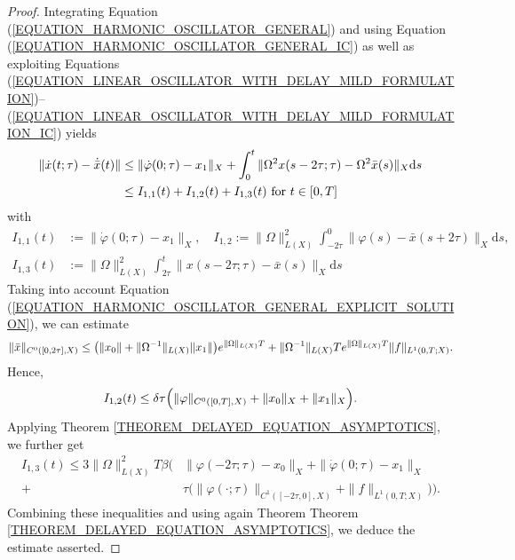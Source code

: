 \documentclass[12pt]{article}
\numberwithin{equation}{section}
\numberwithin{equation}{section}
\begin{document}
	\begin{proof}
		Integrating Equation (\ref{EQUATION_HARMONIC_OSCILLATOR_GENERAL}) and using Equation (\ref{EQUATION_HARMONIC_OSCILLATOR_GENERAL_IC})
		as well as exploiting Equations (\ref{EQUATION_LINEAR_OSCILLATOR_WITH_DELAY_MILD_FORMULATION})--(\ref{EQUATION_LINEAR_OSCILLATOR_WITH_DELAY_MILD_FORMULATION_IC}) yields
		\begin{align*}
			\|\dot{x}(t; \tau) - \dot{\bar{x}}(t)\| &\leq 
			\|\dot{\varphi}(0; \tau) - x_{1}\|_{X} +
			\int_{0}^{t} \|\Omega^{2} x(s - 2\tau; \tau) - \Omega^{2} \bar{x}(s)\|_{X} \mathrm{d}s \\
						&\leq I_{1, 1}(t) + I_{1, 2}(t) + I_{1, 3}(t) \text{ for } t \in [0, T] \notag
		\end{align*}
		with
		\begin{align*}
			I_{1, 1}(t) &:= \|\dot{\varphi}(0; \tau) - x_{1}\|_{X}, \quad I_{1, 2} := \|\Omega\|_{L(X)}^{2} \int_{-2\tau}^{0} \|\varphi(s) - \bar{x}(s + 2\tau)\|_{X} \mathrm{d}s, \\
						I_{1, 3}(t) &:= \|\Omega\|_{L(X)}^{2} \int_{2\tau}^{t} \|x(s - 2\tau; \tau) - \bar{x}(s)\|_{X} \mathrm{d}s
		\end{align*}
		Taking into account Equation (\ref{EQUATION_HARMONIC_OSCILLATOR_GENERAL_EXPLICIT_SOLUTION}), we can estimate
		\begin{equation}
			\|\bar{x}\|_{C^{0}([0, 2\tau], X)} \leq \big(\|x_{0}\| + \|\Omega^{-1}\|_{L(X)} \|x_{1}\|\big) e^{\|\Omega\|_{L(X)} T} +
			\|\Omega^{-1}\|_{L(X)} T e^{\|\Omega\|_{L(X)} T} \|f\|_{L^{1}(0, T; X)}. \notag
		\end{equation}
		Hence,
		\begin{align*}
			I_{1, 2}(t) \leq \delta \tau \Big(\|\varphi\|_{C^{0}([0, T], X)} + \|x_{0}\|_{X} + \|x_{1}\|_{X}\Big). \notag
		\end{align*}
		Applying Theorem \ref{THEOREM_DELAYED_EQUATION_ASYMPTOTICS}, we further get
		\begin{align*}
			I_{1, 3}(t) \leq 3 \|\Omega\|_{L(X)}^{2} T \beta \Big(&\|\varphi(-2\tau; \tau) - x_{0}\|_{X} + \|\dot{\varphi}(0; \tau) - x_{1}\|_{X} \\
			+ &\tau \big(\|\varphi(\cdot; \tau)\|_{C^{1}([-2\tau, 0], X)} + \|f\|_{L^{1}(0, T; X)}\big)\Big).
		\end{align*}
		Combining these inequalities and using again Theorem Theorem \ref{THEOREM_DELAYED_EQUATION_ASYMPTOTICS}, we deduce the estimate asserted.
	\end{proof}
\end{document}

